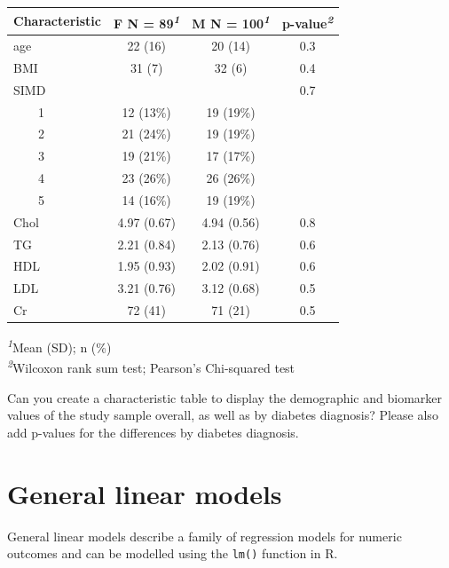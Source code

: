 \documentclass[
]{book}
\begin{document}
\begin{table}[t]
\fontsize{12.0pt}{14.0pt}\selectfont
\begin{tabular*}{\linewidth}{@{\extracolsep{\fill}}lccc}
\toprule
\textbf{Characteristic} & \textbf{F}  N = 89\textsuperscript{\textit{1}} & \textbf{M}  N = 100\textsuperscript{\textit{1}} & \textbf{p-value}\textsuperscript{\textit{2}} \\ 
\midrule\addlinespace[2.5pt]
age & 22 (16) & 20 (14) & 0.3 \\ 
BMI & 31 (7) & 32 (6) & 0.4 \\ 
SIMD &  &  & 0.7 \\ 
    1 & 12 (13\%) & 19 (19\%) &  \\ 
    2 & 21 (24\%) & 19 (19\%) &  \\ 
    3 & 19 (21\%) & 17 (17\%) &  \\ 
    4 & 23 (26\%) & 26 (26\%) &  \\ 
    5 & 14 (16\%) & 19 (19\%) &  \\ 
Chol & 4.97 (0.67) & 4.94 (0.56) & 0.8 \\ 
TG & 2.21 (0.84) & 2.13 (0.76) & 0.6 \\ 
HDL & 1.95 (0.93) & 2.02 (0.91) & 0.6 \\ 
LDL & 3.21 (0.76) & 3.12 (0.68) & 0.5 \\ 
Cr & 72 (41) & 71 (21) & 0.5 \\ 
\bottomrule
\end{tabular*}
\begin{minipage}{\linewidth}
\vspace{.05em}
\textsuperscript{\textit{1}}Mean (SD); n (\%)\\
\textsuperscript{\textit{2}}Wilcoxon rank sum test; Pearson's Chi-squared test\\
\end{minipage}
\end{table}

Can you create a characteristic table to display the demographic and biomarker values of the study sample overall, as well as by diabetes diagnosis? Please also add p-values for the differences by diabetes diagnosis.

\section{General linear models}\label{general-linear-models}

General linear models describe a family of regression models for numeric outcomes and can be modelled using the \texttt{lm()} function in R.
\end{document}
